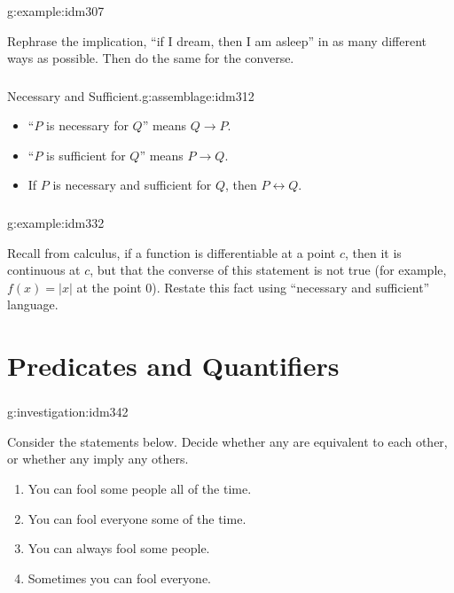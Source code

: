 \documentclass[11pt, compress]{beamer}
\renewcommand{\iff}{\leftrightarrow}
\newcommand{\imp}{\rightarrow}
\begin{document}
\begin{frame}
\frametitle{}
\begin{example}{}{g:example:idm307}%

Rephrase the implication, ``if I dream, then I am asleep'' in as many different ways as possible. Then do the same for the converse.\end{example}
\end{frame}
 
\begin{frame}
\frametitle{}
\begin{assemblage}{Necessary and Sufficient.}{g:assemblage:idm312}%

\begin{itemize}
\item{}``\(P\) is necessary for \(Q\)'' means \(Q \imp P\).

\item{}``\(P\) is sufficient for \(Q\)'' means \(P \imp Q\).

\item{}
If \(P\) is necessary and sufficient for \(Q\), then \(P \iff Q\).
\end{itemize}\end{assemblage}
\end{frame}
 
\begin{frame}
\frametitle{}
\begin{example}{}{g:example:idm332}%

Recall from calculus, if a function is differentiable at a point \(c\), then it is continuous at \(c\), but that the converse of this statement is not true (for example, \(f(x) = |x|\) at the point 0). Restate this fact using ``necessary and sufficient'' language.\end{example}
\end{frame}
 


\section{Predicates and Quantifiers}
\begin{frame}
\frametitle{}
\begin{investigation}{}{g:investigation:idm342}%

Consider the statements below. Decide whether any are equivalent to each other, or whether any imply any others.
\begin{enumerate}
\item{}
You can fool some people all of the time.

\item{}
You can fool everyone some of the time.

\item{}
You can always fool some people.

\item{}
Sometimes you can fool everyone.
\end{enumerate}\end{investigation}
\end{frame}
 
\end{document}
